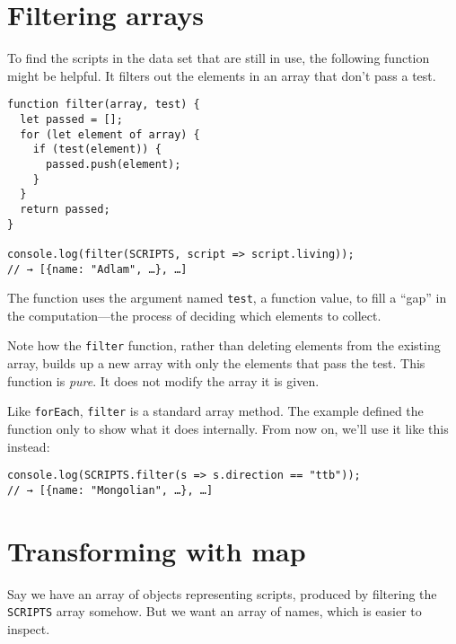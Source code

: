 \section{Filtering arrays}

To find the scripts in the data set that are still in use, the following function might be helpful. It filters out the elements in an array that don't pass a test.

\begin{lstlisting}
function filter(array, test) {
  let passed = [];
  for (let element of array) {
    if (test(element)) {
      passed.push(element);
    }
  }
  return passed;
}

console.log(filter(SCRIPTS, script => script.living));
// → [{name: "Adlam", …}, …]
\end{lstlisting}
\noindent{}

The function uses the argument named \lstinline`test`, a function value, to fill a ``gap'' in the computation—the process of deciding which elements to collect.

Note how the \lstinline`filter` function, rather than deleting elements from the existing array, builds up a new array with only the elements that pass the test. This function is \emph{pure}. It does not modify the array it is given.

Like \lstinline`forEach`, \lstinline`filter` is a standard array method. The example defined the function only to show what it does internally. From now on, we'll use it like this instead:

\begin{lstlisting}
console.log(SCRIPTS.filter(s => s.direction == "ttb"));
// → [{name: "Mongolian", …}, …]
\end{lstlisting}
\noindent

\label{higher_order.map}\section{Transforming with map}

Say we have an array of objects representing scripts, produced by filtering the \lstinline`SCRIPTS` array somehow. But we want an array of names, which is easier to inspect.

